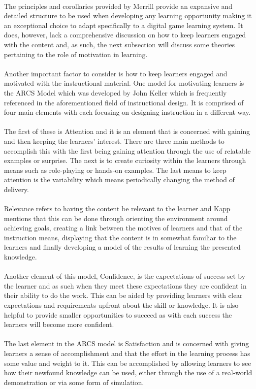 \documentclass[conference]{IEEEtran}
\begin{document}
\\
The principles and corollaries provided by Merrill\cite{Merrill2002} provide an expansive and detailed structure to be used when developing any learning opportunity making it an exceptional choice to adapt specifically to a digital game learning system.  It does, however, lack a comprehensive discussion on how to keep learners engaged with the content and, as such, the next subsection will discuss some theories pertaining to the role of motivation in learning.
\\\\
Another important factor to consider is how to keep learners engaged and motivated with the instructional material. One model for motivating learners is the ARCS Model which was developed by John Keller which is frequently referenced in the aforementioned field of instructional design\cite{Kapp2012a}. It is comprised of four main elements with each focusing on designing instruction in a different way\cite{Kapp2012a}. 
\\\\
The first of these is Attention and it is an element that is concerned with gaining and then keeping the learners’ interest. There are three main methods to accomplish this with the first being gaining attention through the use of relatable examples or surprise. The next is to create curiosity within the learners through means such as role-playing or hands-on examples. The last means to keep attention is the variability which means periodically changing the method of delivery\cite{Kapp2012a}.
\\\\
Relevance refers to having the content be relevant to the learner and Kapp\cite{Kapp2012a} mentions that this can be done through orienting the environment around achieving goals, creating a link between the motives of learners and that of the instruction means, displaying that the content is in somewhat familiar to the learners and finally developing a model of the results of learning the presented knowledge.
\\\\
Another element of this model, Confidence, is the expectations of success set by the learner and as such when they meet these expectations they are confident in their ability to do the work\cite{Kapp2012a}. This can be aided by providing learners with clear expectations and requirements upfront about the skill or knowledge. It is also helpful to provide smaller opportunities to succeed as with each success the learners will become more confident\cite{Kapp2012a}.
\\\\
The last element in the ARCS model is Satisfaction and is concerned with giving learners a sense of accomplishment and that the effort in the learning process has some value and weight to it\cite{Kapp2012a}. This can be accomplished by allowing learners to see how their newfound knowledge can be used, either through the use of a real-world demonstration or via some form of simulation\cite{Kapp2012a}.
\end{document}

